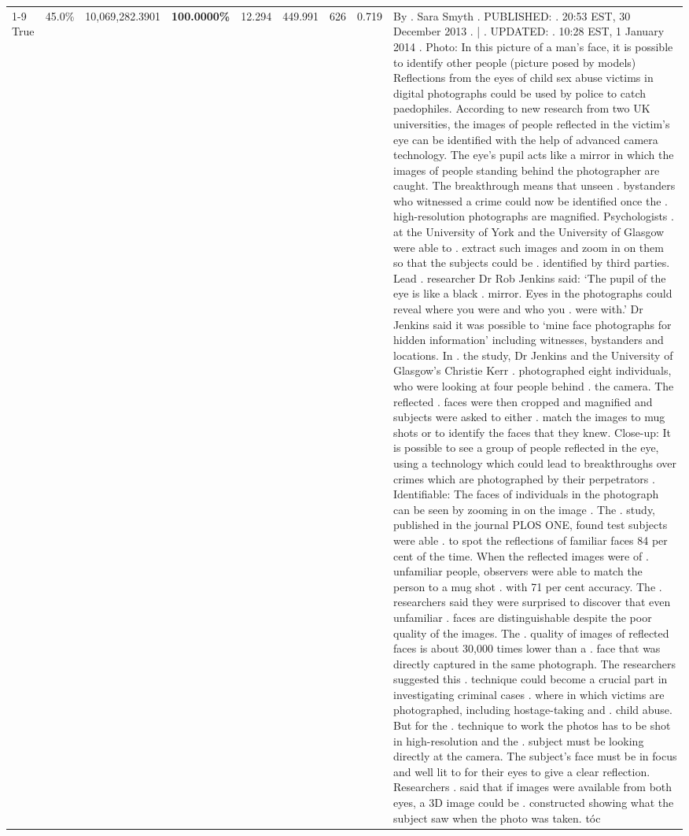 \begin{table}[H]
\begin{tabular}{lllrlllll}
\cline{1-9}
True & 45.0\% & 10,069,282.3901 & \bfseries \color{red} 100.0000\% & 12.294 & 449.991 & 626 & 0.719 & By . Sara Smyth . PUBLISHED: . 20:53 EST, 30 December 2013 . | . UPDATED: . 10:28 EST, 1 January 2014 . Photo: In this picture of a man's face, it is possible to identify other people (picture posed by models) Reflections from the eyes of child sex abuse victims in digital photographs could be used by police to catch paedophiles. According to new research from two UK universities, the images of people reflected in the victim's eye can be identified with the help of advanced camera technology. The eye's pupil acts like a mirror in which the images of people standing behind the photographer are caught. The breakthrough means that unseen . bystanders who witnessed a crime could now be identified once the . high-resolution photographs are magnified. Psychologists . at the University of York and the University of Glasgow were able to . extract such images and zoom in on them so that the subjects could be . identified by third parties. Lead . researcher Dr Rob Jenkins said: ‘The pupil of the eye is like a black . mirror. Eyes in the photographs could reveal where you were and who you . were with.' Dr Jenkins said it was possible to ‘mine face photographs for hidden information' including witnesses, bystanders and locations. In . the study, Dr Jenkins and the University of Glasgow's Christie Kerr . photographed eight individuals, who were looking at four people behind . the camera. The reflected . faces were then cropped and magnified and subjects were asked to either . match the images to mug shots or to identify the faces that they knew. Close-up: It is possible to see a group of people reflected in the eye, using a technology which could lead to breakthroughs over crimes which are photographed by their perpetrators . Identifiable: The faces of individuals in the photograph can be seen by zooming in on the image . The . study, published in the journal PLOS ONE, found test subjects were able . to spot the reflections of familiar faces 84 per cent of the time. When the reflected images were of . unfamiliar people, observers were able to match the person to a mug shot . with 71 per cent accuracy. The . researchers said they were surprised to discover that even unfamiliar . faces are distinguishable despite the poor quality of the images. The . quality of images of reflected faces is about 30,000 times lower than a . face that was directly captured in the same photograph. The researchers suggested this . technique could become a crucial part in investigating criminal cases . where in which victims are photographed, including hostage-taking and . child abuse. But for the . technique to work the photos has to be shot in high-resolution and the . subject must be looking directly at the camera. The subject's face must be in focus and well lit to for their eyes to give a clear reflection. Researchers . said that if images were available from both eyes, a 3D image could be . constructed showing what the subject saw when the photo was taken. tóc \\

\end{tabular}
\end{table}
